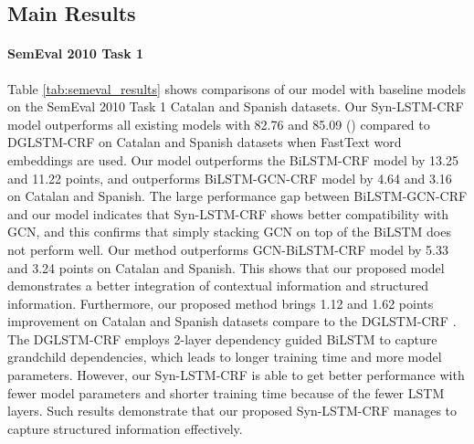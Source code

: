 \documentclass[11pt]{article}
\begin{document}
\subsection{Main Results}
\paragraph{SemEval 2010 Task 1}
\label{sec:semeval}
Table \ref{tab:semeval_results} shows comparisons of our model with baseline models on 
the SemEval 2010 Task 1 Catalan and Spanish datasets.
Our Syn-LSTM-CRF model outperforms all existing models with  82.76 and 85.09 () compared to DGLSTM-CRF on Catalan and Spanish datasets when FastText word embeddings are used. 
Our model outperforms the BiLSTM-CRF model by 13.25 and 11.22  points, and outperforms BiLSTM-GCN-CRF \cite{Jie2019DependencyGuidedLF} model by 4.64 and 3.16 on Catalan and Spanish. 
The large performance gap between BiLSTM-GCN-CRF and our model indicates that Syn-LSTM-CRF shows better compatibility with GCN, and this confirms that simply stacking GCN on top of the BiLSTM does not perform well. 
Our method outperforms GCN-BiLSTM-CRF model by 5.33 and 3.24  points on Catalan and Spanish. This shows that our proposed model demonstrates a better integration of  contextual information and structured information.
Furthermore, our proposed method brings 1.12 and 1.62  points improvement on  Catalan and Spanish datasets compare to the DGLSTM-CRF \cite{Jie2019DependencyGuidedLF}. 
The DGLSTM-CRF employs 2-layer dependency guided BiLSTM to capture grandchild dependencies, which leads to longer training time and more model parameters. However, our Syn-LSTM-CRF is able to get better performance with fewer model parameters and shorter training time because of the fewer LSTM layers. Such results demonstrate that our proposed Syn-LSTM-CRF manages to  capture structured information effectively.
\end{document}
